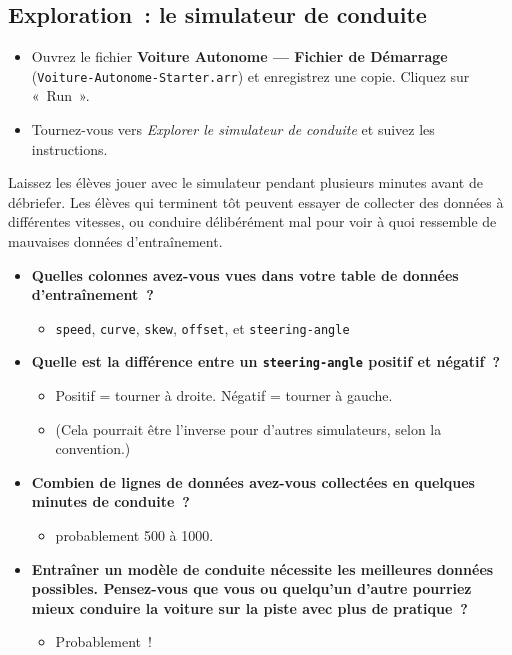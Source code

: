 \documentclass[12pt,a4paper]{article}
\begin{document}
\subsection{Exploration~: le simulateur de conduite}

\begin{activitybox}
  \begin{itemize}
    \item Ouvrez le fichier \textbf{Voiture Autonome — Fichier de Démarrage} (\texttt{Voiture\allowbreak-Autonome\allowbreak-Starter.arr}) et enregistrez une copie. Cliquez sur «~Run~».
    \item Tournez-vous vers \emph{Explorer le simulateur de conduite} et suivez les instructions.
  \end{itemize}

  Laissez les élèves jouer avec le simulateur pendant plusieurs minutes avant de débriefer. Les élèves qui terminent tôt peuvent essayer de collecter des données à différentes vitesses, ou conduire délibérément mal pour voir à quoi ressemble de mauvaises données d'entraînement.
\end{activitybox}

\begin{thinkbox}
  \begin{itemize}
    \item \textbf{Quelles colonnes avez-vous vues dans votre table de données d'entraînement~?}
    \begin{itemize}
      \item \texttt{speed}, \texttt{curve}, \texttt{skew}, \texttt{offset}, et \texttt{steering-angle}
    \end{itemize}
    \item \textbf{Quelle est la différence entre un \texttt{steering-angle} positif et négatif~?}
    \begin{itemize}
      \item Positif = tourner à droite. Négatif = tourner à gauche.
      \item (Cela pourrait être l'inverse pour d'autres simulateurs, selon la convention.)
    \end{itemize}
    \item \textbf{Combien de lignes de données avez-vous collectées en quelques minutes de conduite~?}
    \begin{itemize}
      \item probablement 500 à 1000.
    \end{itemize}
    \item \textbf{Entraîner un modèle de conduite nécessite les meilleures données possibles. Pensez-vous que vous ou quelqu'un d'autre pourriez mieux conduire la voiture sur la piste avec plus de pratique~?}
    \begin{itemize}
      \item Probablement~!
    \end{itemize}
  \end{itemize}
\end{thinkbox}
\end{document}
